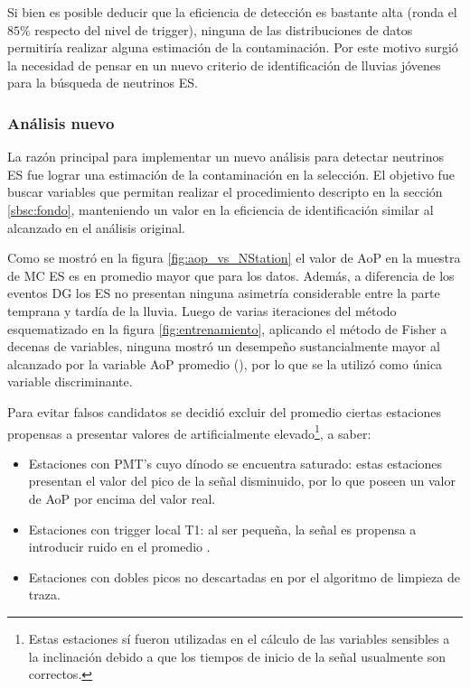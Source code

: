 	Si bien es posible deducir que la eficiencia de detección es bastante alta (ronda el $85\%$ respecto del nivel de trigger), ninguna de las distribuciones de datos permitiría realizar alguna estimación de la contaminación.
	Por este motivo surgió la necesidad de pensar en un nuevo criterio de identificación de lluvias jóvenes para la búsqueda de neutrinos ES.
	
	\subsubsection{Análisis nuevo}
	
	La razón principal para implementar un nuevo análisis para detectar neutrinos ES fue lograr una estimación de la contaminación en la selección.
	El objetivo fue buscar variables que permitan realizar el procedimiento descripto en la sección \ref{sbsc:fondo}, manteniendo un valor en la eficiencia de identificación similar al alcanzado en el análisis original.
	
	Como se mostró en la figura \ref{fig:aop_vs_NStation} el valor de AoP en la muestra de MC ES es en promedio mayor que para los datos.
	Adem\'as, a diferencia de los eventos DG los ES no presentan ninguna asimetría considerable entre la parte temprana y tardía de la lluvia.
	Luego de varias iteraciones del método esquematizado en la figura \ref{fig:entrenamiento}, aplicando el método de Fisher a decenas de variables, ninguna mostr\'o un desempe\~no sustancialmente mayor al alcanzado por la variable AoP promedio (\aop{}), por lo que se la utiliz\'o como \'unica variable discriminante.
	
	Para evitar falsos candidatos se decidió excluir del promedio ciertas estaciones propensas a presentar valores de \aop{} artificialmente elevado\footnote{Estas estaciones sí fueron utilizadas en el cálculo de las variables sensibles a la inclinación debido a que los tiempos de inicio de la señal usualmente son correctos.}, a saber:
	\begin{itemize}
	 \item Estaciones con PMT's cuyo dínodo se encuentra saturado: estas estaciones presentan el valor del pico de la señal disminuido, por lo que poseen un valor de AoP por encima del valor real.
	 \item Estaciones con trigger local T1: al ser pequeña, la señal es propensa a introducir ruido en el promedio \aop{}.
	 \item Estaciones con dobles picos no descartadas en por el algoritmo de limpieza de traza.
	\end{itemize}
	
